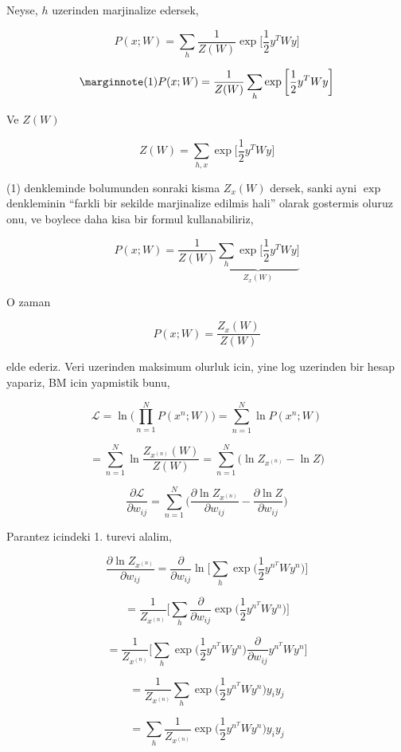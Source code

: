 \documentclass[12pt,fleqn]{article}\usepackage{../common}
\begin{document}
Neyse, $h$ uzerinden marjinalize edersek,

$$ P(x;W) = \sum_h \frac{1}{Z(W)} \exp 
\bigg[ 
\frac{1}{2} y^T W y
\bigg]
$$


$$  
\mlabel{1}
P(x;W) = \frac{1}{Z(W)}  \sum_h \exp 
\bigg[ 
\frac{1}{2} y^T W y
\bigg]
$$


Ve $Z(W)$ 

$$ Z(W) = \sum_{h,x} \exp 
\bigg[ 
\frac{1}{2} y^T W y
\bigg]
$$

(1) denkleminde bolumunden sonraki kisma $Z_x(W)$ dersek, sanki ayni $\exp$
denkleminin ``farkli bir sekilde marjinalize edilmis hali'' olarak
gostermis oluruz onu, ve boylece daha kisa bir formul kullanabiliriz,

$$  
P(x;W) = \frac{1}{Z(W)}  
\underbrace{
\sum_h \exp 
\bigg[ 
\frac{1}{2} y^T W y
\bigg]
}_{Z_x(W)}
$$

O zaman 

$$  
P(x;W) = \frac{Z_x(W)}{Z(W)} 
$$

elde ederiz. Veri uzerinden maksimum olurluk icin, yine log uzerinden bir
hesap yapariz, BM icin yapmistik bunu,

$$  
\mathcal{L} = 
\ln \big( \prod_{n=1}^{N} P(x^{n};W) \big) = 
\sum_{n=1}^{N} \ln P(x^{n};W) 
$$

$$ 
= \sum_{n=1}^{N} \ln \frac{Z_{x^{(n)}}(W)}{Z(W)}  
= \sum_{n=1}^{N}  \big(\ln Z_{x^{(n)}} - \ln Z \big) 
$$


$$ 
\frac{\partial \mathcal{L} }{\partial w_{ij}} = 
 \sum_{n=1}^{N}  \big( \frac{\partial \ln Z_{x^{(n)}} }{\partial w_{ij}}
- \frac{\partial \ln Z }{\partial w_{ij}} \big)
$$

Parantez icindeki 1. turevi alalim,

$$ 
\frac{\partial \ln Z_{x^{(n)}} }{\partial w_{ij}} = 
\frac{\partial }{\partial w_{ij}}  
\ln \bigg[ 
\sum_h \exp \big( \frac{1}{2} y^{n^T} W y^n \big) 
\bigg]
$$


$$ 
= \frac{1}{Z_{x^{(n)}}}  \bigg[ \sum_h \frac{\partial }{\partial w_{ij}} \exp \big( \frac{1}{2} y^{n^T} W y^n  \big) \bigg]
$$

$$ 
= \frac{1}{Z_{x^{(n)}}}  
\bigg[ 
\sum_h  \exp \big( \frac{1}{2} y^{n^T} W y^n  \big) 
\frac{\partial }{\partial w_{ij}} y^{n^T} W y^n 
\bigg]
$$

$$ 
= \frac{1}{Z_{x^{(n)}}}  \sum_h  \exp \big( \frac{1}{2} y^{n^T} W y^n  \big) y_iy_j
$$


$$ 
= \sum_h  \frac{1}{Z_{x^{(n)}}}  \exp \big( \frac{1}{2} y^{n^T} W y^n  \big) y_iy_j
$$
\end{document}
